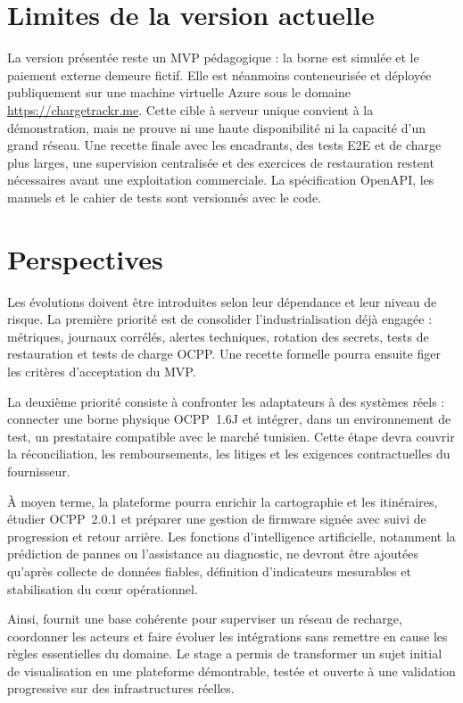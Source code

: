 \section*{Limites de la version actuelle}

La version présentée reste un MVP pédagogique : la borne est simulée et le
paiement externe demeure fictif. Elle est néanmoins conteneurisée et déployée
publiquement sur une machine virtuelle Azure sous le domaine
\url{https://chargetrackr.me}. Cette cible à serveur unique convient à la
démonstration, mais ne prouve ni une haute disponibilité ni la capacité d'un
grand réseau. Une recette finale avec les encadrants, des tests E2E et de charge plus
larges, une supervision centralisée et des exercices de restauration restent
nécessaires avant une exploitation commerciale. La spécification OpenAPI, les
manuels et le cahier de tests sont versionnés avec le code.

\section*{Perspectives}

Les évolutions doivent être introduites selon leur dépendance et leur niveau de
risque. La première priorité est de consolider l'industrialisation déjà engagée :
métriques, journaux corrélés, alertes techniques, rotation des secrets, tests de
restauration et tests de charge OCPP. Une recette formelle pourra ensuite figer
les critères d'acceptation du MVP.

La deuxième priorité consiste à confronter les adaptateurs à des systèmes réels :
connecter une borne physique OCPP~1.6J et intégrer, dans un environnement de test,
un prestataire compatible avec le marché tunisien. Cette étape devra couvrir la
réconciliation, les remboursements, les litiges et les exigences contractuelles
du fournisseur.

À moyen terme, la plateforme pourra enrichir la cartographie et les itinéraires,
étudier OCPP~2.0.1 et préparer une gestion de firmware signée avec suivi de
progression et retour arrière. Les fonctions d'intelligence artificielle,
notamment la prédiction de pannes ou l'assistance au diagnostic, ne devront être
ajoutées qu'après collecte de données fiables, définition d'indicateurs
mesurables et stabilisation du cœur opérationnel.

Ainsi, \ProjectName{} fournit une base cohérente pour superviser un réseau de
recharge, coordonner les acteurs et faire évoluer les intégrations sans remettre
en cause les règles essentielles du domaine. Le stage a permis de transformer un
sujet initial de visualisation en une plateforme démontrable, testée et ouverte
à une validation progressive sur des infrastructures réelles.
